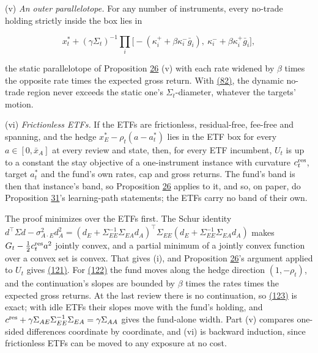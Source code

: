 \documentclass[11pt]{article}
\begin{document}
(v) \emph{An outer parallelotope.} For any number of instruments, every
no-trade holding strictly inside the box lies in

\begin{equation*}
x^*_t+(\gamma\Sigma_t)^{-1}\prod_i\bigl[-(\kappa^+_i+\beta\kappa^-_i\bar g_i),\ \kappa^-_i+\beta\kappa^+_i\bar g_i\bigr],\tag{124}\label{eq:124}
\end{equation*}

the static parallelotope of Proposition \hyperref[res:Proposition-26]{26} (v) with each rate widened
by \(\beta\) times the opposite rate times the expected gross return.
With \hyperref[eq:82]{(82)}, the dynamic no-trade region never exceeds the static one's
\(\Sigma_t\)-diameter, whatever the targets' motion.

(vi) \emph{Frictionless ETFs.} If the ETFs are frictionless, residual-free,
fee-free and spanning, and the hedge \(x^*_E-\rho_t(a-a^*_t)\) lies in the ETF
box for every \(a\in[0,\bar x_A]\) at every review and state, then, for every
ETF incumbent, \(U_t\) is up to a constant the stay objective of a
one-instrument instance with curvature \(c^{\rm res}_t\), target \(a^*_t\) and the
fund's own rates, cap and gross returns. The fund's band is then that
instance's band, so Proposition \hyperref[res:Proposition-26]{26} applies to it, and so, on paper,
do Proposition \hyperref[res:Proposition-31]{31}'s learning-path statements; the ETFs
carry no band of their own.

The proof minimizes over the ETFs first. The Schur identity
\(d^\top\Sigma d-\sigma^2_{A\cdot E}d_A^2=(d_E+\Sigma_{EE}^{-1}\Sigma_{EA}d_A)^\top\Sigma_{EE}(d_E+\Sigma_{EE}^{-1}\Sigma_{EA}d_A)\)
makes \(G_t-\frac12c^{\rm res}_ta^2\) jointly convex, and a partial minimum of a
jointly convex function over a convex set is convex. That gives (i),
and Proposition \hyperref[res:Proposition-26]{26}'s argument applied to \(U_t\) gives \hyperref[eq:121]{(121)}. For \hyperref[eq:122]{(122)}
the fund moves along the hedge direction \((1,-\rho_t)\), and the
continuation's slopes are bounded by \(\beta\) times the rates times the
expected gross returns. At the last review there is no continuation,
so \hyperref[eq:123]{(123)} is exact; with idle ETFs their slopes move with the fund's
holding, and \(c^{\rm res}+\gamma\Sigma_{AE}\Sigma_{EE}^{-1}\Sigma_{EA}=\gamma\Sigma_{AA}\) gives the fund-alone width.
Part (v) compares one-sided differences coordinate by coordinate, and
(vi) is backward induction, since frictionless ETFs can be moved to any
exposure at no cost.
\end{document}
